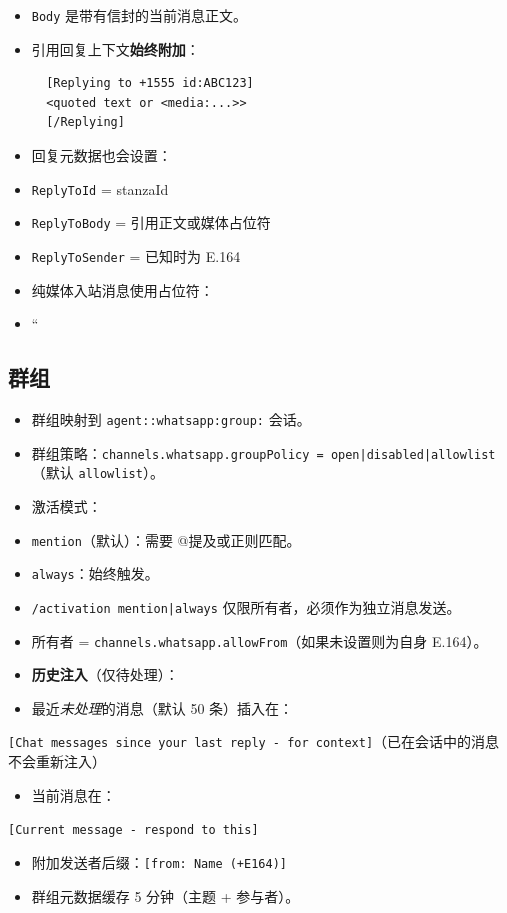 \begin{itemize}
  \item \texttt{Body} 是带有信封的当前消息正文。
  \item 引用回复上下文\textbf{始终附加}：
\begin{lstlisting}
  [Replying to +1555 id:ABC123]
  <quoted text or <media:...>>
  [/Replying]
\end{lstlisting}

  \item 回复元数据也会设置：
  \item \texttt{ReplyToId} = stanzaId
  \item \texttt{ReplyToBody} = 引用正文或媒体占位符
  \item \texttt{ReplyToSender} = 已知时为 E.164
  \item 纯媒体入站消息使用占位符：
  \item ``
\end{itemize}


\subsection{群组}


\begin{itemize}
  \item 群组映射到 \texttt{agent::whatsapp:group:} 会话。
  \item 群组策略：\texttt{channels.whatsapp.groupPolicy = open|disabled|allowlist}（默认 \texttt{allowlist}）。
  \item 激活模式：
  \item \texttt{mention}（默认）：需要 @提及或正则匹配。
  \item \texttt{always}：始终触发。
  \item \texttt{/activation mention|always} 仅限所有者，必须作为独立消息发送。
  \item 所有者 = \texttt{channels.whatsapp.allowFrom}（如果未设置则为自身 E.164）。
  \item \textbf{历史注入}（仅待处理）：
  \item 最近\textit{未处理}的消息（默认 50 条）插入在：
\end{itemize}

\texttt{[Chat messages since your last reply - for context]}（已在会话中的消息不会重新注入）
\begin{itemize}
  \item 当前消息在：
\end{itemize}

\texttt{[Current message - respond to this]}
\begin{itemize}
  \item 附加发送者后缀：\texttt{[from: Name (+E164)]}
  \item 群组元数据缓存 5 分钟（主题 + 参与者）。
\end{itemize}


